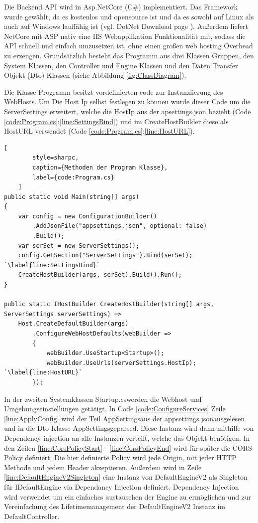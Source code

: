 Die Backend API wird in Asp.NetCore (C\#) implementiert.
Das Framework wurde gewählt, da es kostenlos und opensource
ist und da es sowohl auf Linux als auch auf Windows lauffähig ist
(vgl. DotNet Download page \cite{DotNetDownloadPage}).
Außerdem liefert NetCore mit ASP nativ eine IIS Webapplikation
Funktionalität mit, sodass die API schnell und einfach umzusetzen ist,
ohne einen großen web hosting Overhead zu erzeugen. Grundsätzlich
besteht das Programm aus drei Klassen Gruppen, den System Klassen,
den Controller und Engine Klassen und den Daten Transfer Objekt (Dto)
Klassen (siehe Abbildung \ref{fig:ClassDiagram}).

Die Klasse Programm besitzt vordefinierten code zur Instanziierung
des WebHosts. Um Die Host Ip selbst festlegen zu können wurde dieser
Code um die ServerSettings erweitert, welche die HostIp aus der
apsettings.json bezieht
(Code \ref{code:Program.cs}:\ref{line:SettingsBind}) und im
CreateHostBuilder diese als HostURL verwendet
(Code \ref{code:Program.cs}:\ref{line:HostURL}).

\begin{codeblock}
	\begin{lstlisting}[
		style=sharpc,
		caption={Methoden der Program Klasse},
		label={code:Program.cs}
	]
public static void Main(string[] args)
{
	var config = new ConfigurationBuilder()
		.AddJsonFile("appsettings.json", optional: false)
		.Build();
	var serSet = new ServerSettings();
	config.GetSection("ServerSettings").Bind(serSet); `\label{line:SettingsBind}`
	CreateHostBuilder(args, serSet).Build().Run();
}

public static IHostBuilder CreateHostBuilder(string[] args, ServerSettings serverSettings) =>
	Host.CreateDefaultBuilder(args)
		.ConfigureWebHostDefaults(webBuilder =>
		{
			webBuilder.UseStartup<Startup>();
			webBuilder.UseUrls(serverSettings.HostIp); `\label{line:HostURL}`
		});
	\end{lstlisting}
\end{codeblock}

In der zweiten Systemklassen \grqq Startup.cs\grqq\space werden die
Webhost und Umgebungseinstellungen getätigt.
In Code \ref{code:ConfigureServices} Zeile \ref{line:ApplyConfig}
wird der Teil \grqq AppSettings\grqq\space aus der
\grqq appsettings.json\grqq\space ausgelesen und in die Dto Klasse
\grqq AppSettings\grqq\space geparsed. Diese Instanz wird dann
mithilfe von Dependency injection an alle Instanzen verteilt,
welche das Objekt benötigen. In den Zeilen \ref{line:CorsPolicyStart}
- \ref{line:CorsPolicyEnd} wird für später die CORS Policy definiert.
Die hier definierte Policy wird jede Origin, mit jeder HTTP Methode
und jedem Header akzeptieren. Außerdem wird in Zeile
\ref{line:DefaultEngineV2Singleton} eine Instanz von DefaultEngineV2
als Singleton für IDefaultEngine via Dependancy Injection definiert.
Dependency Injection wird verwendet um ein einfaches austauschen der
Engine zu ermöglichen und zur Vereinfachung des Lifetimemanagement
der DefaultEngineV2 Instanz im DefaultController.

